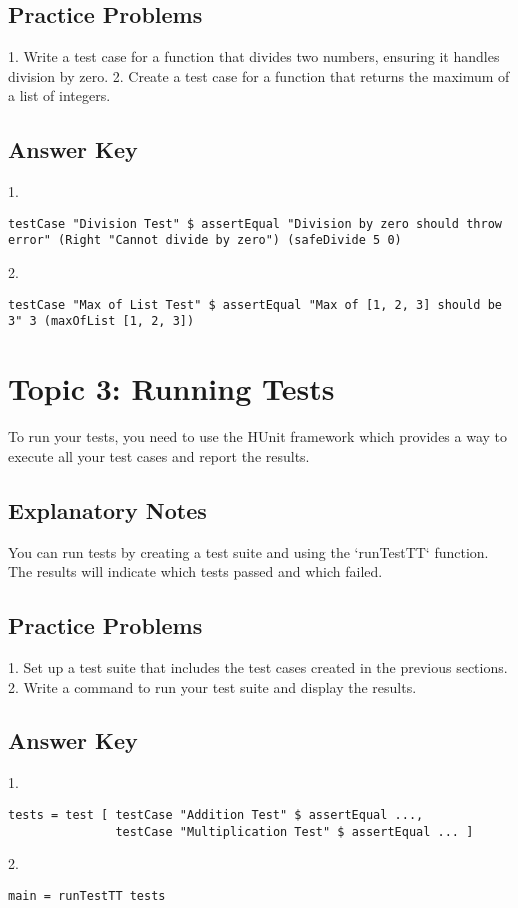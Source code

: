 \documentclass{article}
\begin{document}
\subsection*{Practice Problems}
1. Write a test case for a function that divides two numbers, ensuring it handles division by zero.
2. Create a test case for a function that returns the maximum of a list of integers.

\subsection*{Answer Key}
1. 
\begin{verbatim}
testCase "Division Test" $ assertEqual "Division by zero should throw error" (Right "Cannot divide by zero") (safeDivide 5 0)
\end{verbatim}
2. 
\begin{verbatim}
testCase "Max of List Test" $ assertEqual "Max of [1, 2, 3] should be 3" 3 (maxOfList [1, 2, 3])
\end{verbatim}

\section*{Topic 3: Running Tests}
To run your tests, you need to use the HUnit framework which provides a way to execute all your test cases and report the results.

\subsection*{Explanatory Notes}
You can run tests by creating a test suite and using the `runTestTT` function. The results will indicate which tests passed and which failed.

\subsection*{Practice Problems}
1. Set up a test suite that includes the test cases created in the previous sections.
2. Write a command to run your test suite and display the results.

\subsection*{Answer Key}
1. 
\begin{verbatim}
tests = test [ testCase "Addition Test" $ assertEqual ...,
               testCase "Multiplication Test" $ assertEqual ... ]
\end{verbatim}
2. 
\begin{verbatim}
main = runTestTT tests
\end{verbatim}
\end{document}

